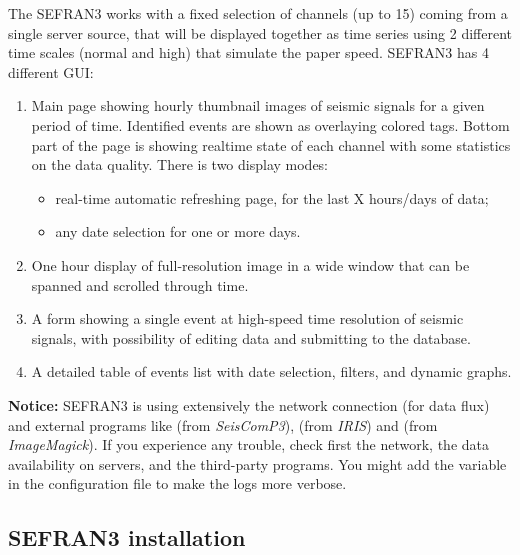 The SEFRAN3 works with a fixed selection of channels (up to 15) coming from a single server source, that will be displayed together as time series using 2 different time scales (normal and high) that simulate the paper speed. SEFRAN3 has 4 different GUI:
\begin{enumerate}

\item Main page showing hourly thumbnail images of seismic signals for a given period of time. Identified events are shown as overlaying colored tags. Bottom part of the page is showing realtime state of each channel with some statistics on the data quality. There is two display modes:
\begin{itemize}
\item real-time automatic refreshing page, for the last X hours/days of data;
\item any date selection for one or more days.
\end{itemize}

\item One hour display of full-resolution image in a wide window that can be spanned and scrolled through time.

\item A form showing a single event at high-speed time resolution of seismic signals, with possibility of editing data and submitting to the database.

\item A detailed table of events list with date selection, filters, and dynamic graphs.

\end{enumerate}

\textbf{Notice:} SEFRAN3 is using extensively the network connection (for data flux) and external programs like  (from \textit{SeisComP3}),  (from \textit{IRIS}) and  (from \textit{ImageMagick}). If you experience any trouble, check first the network, the data availability on servers, and the third-party programs. You might add the variable  in the configuration file to make the logs more verbose.

\subsection{SEFRAN3 installation}


